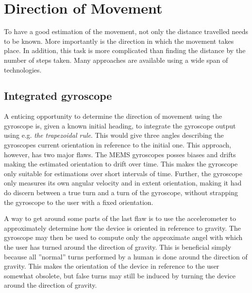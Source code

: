 \documentclass{LTHthesis}
\begin{document}
\section{Direction of Movement}
%
To have a good estimation of the movement, not only the distance travelled needs to be known. More importantly is the direction in which the movement takes place. In addition, this task is more complicated than finding the distance by the number of steps taken. Many approaches are available using a wide span of technologies. 
%
\subsection{Integrated gyroscope}
%
A enticing opportunity to determine the direction of movement using the gyroscope is, given a known initial heading, to integrate the gyroscope output using e.g. \emph{the trapezoidal rule}. This would give three angles describing the gyroscopes current orientation in reference to the initial one. This approach, however, has two major flaws. The MEMS gyroscopes posses biases and drifts making the estimated orientation to drift over time. This makes the gyroscope only suitable for estimations over short intervals of time. Further, the gyroscope only measures its own angular velocity and in extent orientation, making it had do discern between a true turn and a turn of the gyroscope, without strapping the gyroscope to the user with a fixed orientation. 

A way to get around some parts of the last flaw is to use the accelerometer to approximately determine how the device is oriented in reference to gravity. The gyroscope may then be used to compute only the approximate angel with which the user has turned around the direction of gravity. This is beneficial simply because all ''normal'' turns performed by a human is done around the direction of gravity. This makes the orientation of the device in reference to the user somewhat obsolete, but false turns may still be induced by turning the device around the direction of gravity.
% 
\end{document}
